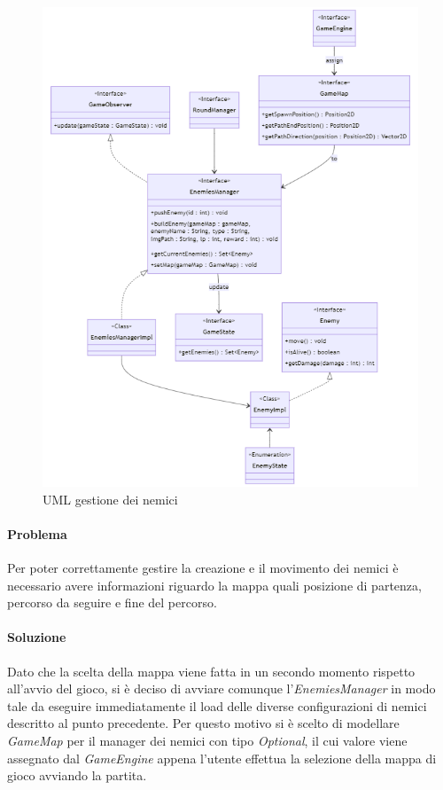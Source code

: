 \documentclass[a4paper,12pt]{report}
\begin{document}
\begin{figure}[H]
    \centering
    \includegraphics[scale=0.8]{RelazioneTD/images/enemiesManagerUML.png}
    \caption{UML gestione dei nemici}
    \label{fig:enter-label}
\end{figure}

\paragraph{Problema} Per poter correttamente gestire la creazione e il movimento dei nemici è necessario avere informazioni riguardo la mappa quali posizione di partenza, percorso da seguire e fine del percorso.

\paragraph{Soluzione} Dato che la scelta della mappa viene fatta in un secondo momento rispetto all'avvio del gioco, si è deciso di avviare comunque l'\textit{EnemiesManager} in modo tale da eseguire immediatamente il load delle diverse configurazioni di nemici descritto al punto precedente. Per questo motivo si è scelto di modellare \textit{GameMap} per il manager dei nemici con tipo \textit{Optional}, il cui valore viene assegnato dal \textit{GameEngine} appena l'utente effettua la selezione della mappa di gioco avviando la partita.
\end{document}

